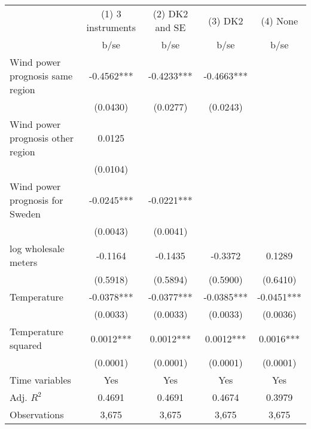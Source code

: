 \begin{tabular}{lcccc}\toprule
                    &(1) 3 instruments   &(2) DK2 and SE   &     (3) DK2   &    (4) None   \\
                    &        b/se   &        b/se   &        b/se   &        b/se   \\
\midrule
Wind power prognosis same region&     -0.4562***&     -0.4233***&     -0.4663***&               \\
                    &    (0.0430)   &    (0.0277)   &    (0.0243)   &               \\
Wind power prognosis other region&      0.0125   &               &               &               \\
                    &    (0.0104)   &               &               &               \\
Wind power prognosis for Sweden&     -0.0245***&     -0.0221***&               &               \\
                    &    (0.0043)   &    (0.0041)   &               &               \\
log wholesale meters&     -0.1164   &     -0.1435   &     -0.3372   &      0.1289   \\
                    &    (0.5918)   &    (0.5894)   &    (0.5900)   &    (0.6410)   \\
Temperature         &     -0.0378***&     -0.0377***&     -0.0385***&     -0.0451***\\
                    &    (0.0033)   &    (0.0033)   &    (0.0033)   &    (0.0036)   \\
Temperature squared &      0.0012***&      0.0012***&      0.0012***&      0.0016***\\
                    &    (0.0001)   &    (0.0001)   &    (0.0001)   &    (0.0001)   \\
Time variables      &         Yes   &         Yes   &         Yes   &         Yes   \\
\midrule
Adj. \(R^2\)        &      0.4691   &      0.4691   &      0.4674   &      0.3979   \\
Observations        &       3,675   &       3,675   &       3,675   &       3,675   \\
\bottomrule\end{tabular}
